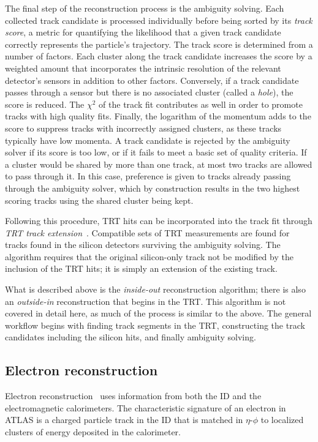 The final step of the reconstruction process is the ambiguity solving.
Each collected track candidate is processed individually before being sorted by its \emph{track score}, a metric for quantifying the likelihood that a given track candidate correctly represents the particle's trajectory.
The track score is determined from a number of factors.
Each cluster along the track candidate increases the score by a weighted amount that incorporates the intrinsic resolution of the relevant detector's sensors in addition to other factors.
Conversely, if a track candidate passes through a sensor but there is no associated cluster (called a \emph{hole}), the score is reduced.
The $\chi^2$ of the track fit contributes as well in order to promote tracks with high quality fits.
Finally, the logarithm of the momentum adds to the score to suppress tracks with incorrectly assigned clusters, as these tracks typically have low momenta.
A track candidate is rejected by the ambiguity solver if its score is too low, or if it fails to meet a basic set of quality criteria.
If a cluster would be shared by more than one track, at most two tracks are allowed to pass through it.
In this case, preference is given to tracks already passing through the ambiguity solver, which by construction results in the two highest scoring tracks using the shared cluster being kept.

Following this procedure, TRT hits can be incorporated into the track fit through \emph{TRT track extension}~\cite{2008.newt}.
Compatible sets of TRT measurements are found for tracks found in the silicon detectors surviving the ambiguity solving.
The algorithm requires that the original silicon-only track not be modified by the inclusion of the TRT hits; it is simply an extension of the existing track.

What is described above is the \emph{inside-out} reconstruction algorithm; there is also an \emph{outside-in} reconstruction that begins in the TRT.
This algorithm is not covered in detail here, as much of the process is similar to the above.
The general workflow begins with finding track segments in the TRT, constructing the track candidates including the silicon hits, and finally ambiguity solving.

\subsection{Electron reconstruction}\label{detector:electron_reconstruction}
Electron reconstruction~\cite{2019.electron-reco-id} uses information from both the ID and the electromagnetic calorimeters.
The characteristic signature of an electron in ATLAS is a charged particle track in the ID that is matched in $\eta$-$\phi$ to localized clusters of energy deposited in the calorimeter.

